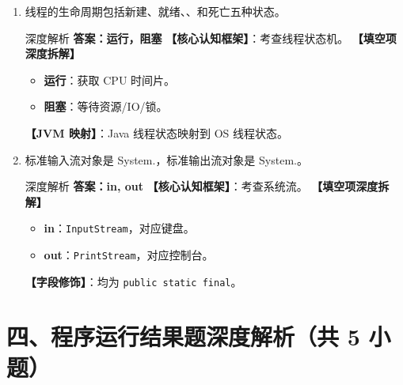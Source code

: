 ﻿\documentclass[12pt, a4paper]{ctexart}
\newcommand{\code}[1]{\texttt{#1}}
\newcommand{\blank}{\underline{\hspace{2em}}}
\begin{document}
\begin{enumerate}[label=\textbf{\arabic*.}, itemsep=1em]
	\item 线程的生命周期包括新建、就绪、\blank、\blank 和死亡五种状态。
	      \begin{bluebox}{深度解析}
		      \textbf{答案：运行，阻塞}
		      \textbf{【核心认知框架】}：考查线程状态机。
		      \textbf{【填空项深度拆解】}
		      \begin{itemize}[leftmargin=*, nosep]
			      \item \textbf{运行}：获取 CPU 时间片。
			      \item \textbf{阻塞}：等待资源/IO/锁。
		      \end{itemize}
		      \textbf{【JVM 映射】}：Java 线程状态映射到 OS 线程状态。
	      \end{bluebox}

	\item 标准输入流对象是 System.\blank，标准输出流对象是 System.\blank。
	      \begin{bluebox}{深度解析}
		      \textbf{答案：in, out}
		      \textbf{【核心认知框架】}：考查系统流。
		      \textbf{【填空项深度拆解】}
		      \begin{itemize}[leftmargin=*, nosep]
			      \item \textbf{in}：\code{InputStream}，对应键盘。
			      \item \textbf{out}：\code{PrintStream}，对应控制台。
		      \end{itemize}
		      \textbf{【字段修饰】}：均为 \code{public static final}。
	      \end{bluebox}
\end{enumerate}

\section*{四、程序运行结果题深度解析（共 5 小题）}
\end{document}
